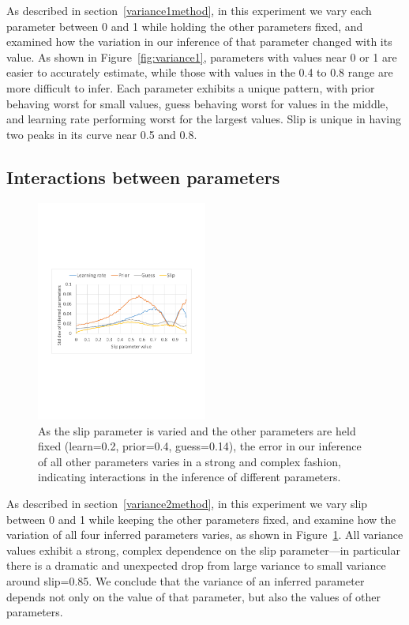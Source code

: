 \documentclass{edm_template}
\begin{document}
As described in section~\ref{variance1method}, in this experiment we vary each parameter between 0 and 1 while holding the other parameters fixed, and examined how the variation in our inference of that parameter changed with its value. As shown in Figure~\ref{fig:variance1}, parameters with values near 0 or 1 are easier to accurately estimate, while those with values in the 0.4 to 0.8 range are more difficult to infer. Each parameter exhibits a unique pattern, with prior behaving worst for small values, guess behaving worst for values in the middle, and learning rate performing worst for the largest values. Slip is unique in having two peaks in its curve near 0.5 and 0.8.

\subsection{Interactions between parameters}
\label{variance2}

\begin{figure}
\centering
\includegraphics[width=0.5\textwidth]{data/variance2.pdf}
\caption{As the slip parameter is varied and the other parameters are held fixed (learn=0.2, prior=0.4, guess=0.14), the error in our inference of all other parameters varies in a strong and complex fashion, indicating interactions in the inference of different parameters.}
\label{fig:variance2}
\end{figure}

As described in section~\ref{variance2method}, in this experiment we vary slip between 0 and 1 while keeping the other parameters fixed, and examine how the variation of all four inferred parameters varies, as shown in Figure~\ref{fig:variance2}. All variance values exhibit a strong, complex dependence on the slip parameter---in particular there is a dramatic and unexpected drop from large variance to small variance around slip=0.85. We conclude that the variance of an inferred parameter depends not only on the value of that parameter, but also the values of other parameters.
\end{document}
